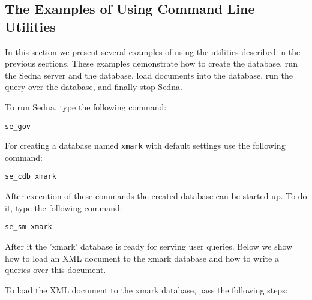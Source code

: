 \documentclass[a4paper,12pt]{article}
\begin{document}
\subsection{The Examples of Using Command Line Utilities}

In this section we present several examples of using the utilities described in the previous sections. These examples demonstrate how to create the database, run the Sedna server and the database, load documents into the database, run the query over the database, and finally stop Sedna.

To run Sedna, type the following command:

\begin{verbatim}
se_gov
\end{verbatim}

For creating a database named \verb!xmark! with default settings use the following command:

\begin{verbatim}
se_cdb xmark
\end{verbatim}

After execution of these commands the created database can be started up. To do it, type the following command:

\begin{verbatim}
se_sm xmark
\end{verbatim}

After it the 'xmark' database is ready for serving user queries. Below we show how to load an XML document to the xmark database and how to write a queries over this document.

To load the XML document to the xmark database, pass the following steps:
\end{document}
